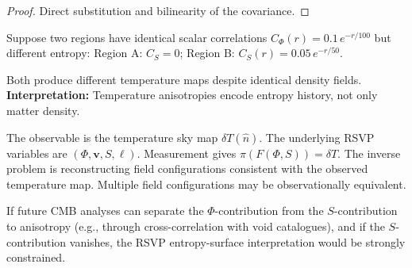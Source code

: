 \begin{proof}
  Direct substitution and bilinearity of the covariance.
\end{proof}

\begin{WorkedExample}
  Suppose two regions have identical scalar correlations
  $C_\Phi(r) = 0.1\,e^{-r/100}$ but different entropy:
  Region A: $C_S = 0$; Region B: $C_S(r) = 0.05\,e^{-r/50}$.

  Both produce different temperature maps despite identical
  density fields.
  \textbf{Interpretation:} Temperature anisotropies encode
  entropy history, not only matter density.
\end{WorkedExample}

\begin{ReconView}
  The observable is the temperature sky map $\delta T(\hat{n})$.
  The underlying RSVP variables are $(\Phi, \mathbf{v}, S, \ell)$.
  Measurement gives
  $\pi(F(\Phi, S)) = \delta T$.
  The inverse problem is reconstructing field configurations
  consistent with the observed temperature map.
  Multiple field configurations may be observationally equivalent.
\end{ReconView}

\begin{Falsifiability}
  If future CMB analyses can separate the $\Phi$-contribution
  from the $S$-contribution to anisotropy (e.g., through
  cross-correlation with void catalogues), and if the
  $S$-contribution vanishes, the RSVP entropy-surface
  interpretation would be strongly constrained.
\end{Falsifiability}

\begin{ProblemSet}
\end{ProblemSet}
